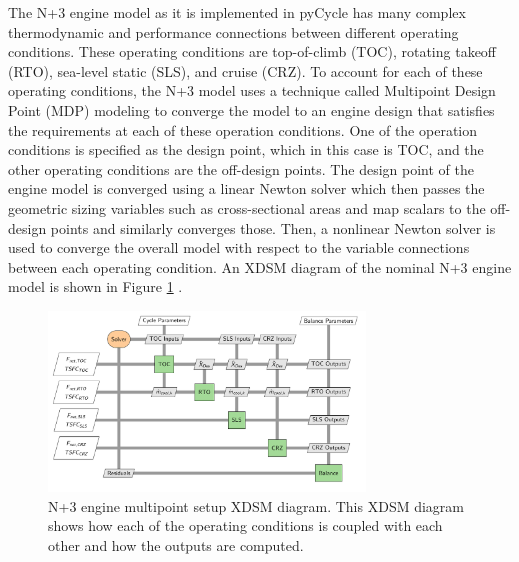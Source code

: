 \documentclass[conf]{new-aiaa}
\begin{document}
\noindent
The N+3 engine model as it is implemented in pyCycle has many complex thermodynamic and performance connections between different operating conditions.
These operating conditions are top-of-climb (TOC), rotating takeoff (RTO), sea-level static (SLS), and cruise (CRZ).
To account for each of these operating conditions, the N+3 model uses a technique called Multipoint Design Point (MDP) modeling to converge the model to an engine design that satisfies the requirements at each of these operation conditions.
One of the operation conditions is specified as the design point, which in this case is TOC, and the other operating conditions are the off-design points.
The design point of the engine model is converged using a linear Newton solver which then passes the geometric sizing variables such as cross-sectional areas and map scalars to the off-design points and similarly converges those.
Then, a nonlinear Newton solver is used to converge the overall model with respect to the variable connections between each operating condition.
An XDSM diagram of the nominal N+3 engine model is shown in Figure \ref{fig:N3_xdsm} \cite{Hendricks2019}.

\begin{figure}[!hbt]
    \centering
    \includegraphics[width=0.75\textwidth]{N3_xdsm.pdf}
    \caption{
        N+3 engine multipoint setup XDSM diagram.
        This XDSM diagram shows how each of the operating conditions is coupled with each other and how the outputs are computed.
    }
    \label{fig:N3_xdsm}
\end{figure}
\end{document}
